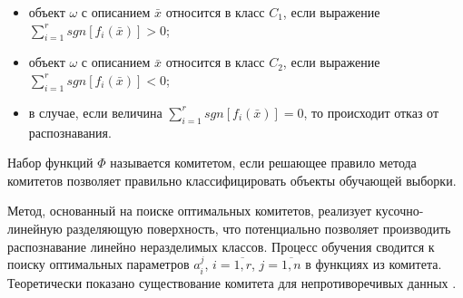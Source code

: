 \begin{itemize}
	\item объект $\omega$ с описанием $\bar{x}$ относится в класс $C_1$, если выражение $\sum_{i=1}^{r} sgn [f_i(\bar{x})] > 0$;
	\item объект $\omega$ с описанием $\bar{x}$ относится в класс $C_2$, если выражение $\sum_{i=1}^{r} sgn [f_i(\bar{x})] < 0$;
	\item в случае, если величина $\sum_{i=1}^{r} sgn [f_i(\bar{x})] = 0$, то происходит отказ от распознавания.
\end{itemize}

Набор функций $\Phi$ называется комитетом, если решающее правило метода комитетов позволяет правильно классифицировать объекты обучающей выборки.

Метод, основанный на поиске оптимальных комитетов, реализует кусочно-линейную разделяющую поверхность, что потенциально позволяет производить распознавание линейно неразделимых классов.
Процесс обучения сводится к поиску оптимальных параметров $a_i^j$, $i = \overline{1, r}$, $j = \overline{1, n}$ в функциях из комитета.
Теоретически показано существование комитета для непротиворечивых данных \cite{mazurov1990method}.


\clearpage
